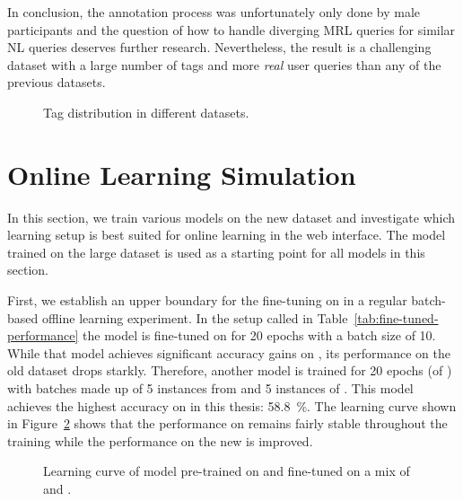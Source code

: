 In conclusion, the annotation process was unfortunately only done by male
participants and the question of how to handle diverging MRL queries for similar
NL queries deserves further research. Nevertheless, the result is a challenging
dataset with a large number of tags and more \emph{real} user queries than any
of the previous \nlmaps{} datasets.

\begin{figure}[h]
  \centering
  \resizebox{\textwidth}{!}{}
  \caption[Tag distribution]{Tag distribution in different \nlmaps{} datasets.}
  \label{fig:tag-distribution}
\end{figure}

\section{Online Learning Simulation}
\label{sec:online-simulation}

In this section, we train various models on the new \nlmapsfour{} dataset and
investigate which learning setup is best suited for online learning in the web
interface. The model trained on the large \nlmapsthree{} dataset is used as a
starting point for all models in this section.

First, we establish an upper boundary for the fine-tuning on \nlmfour{} in a
regular batch-based offline learning experiment. In the setup called \nlmthree{}
\textrightarrow{} \nlmfour{} in Table~\ref{tab:fine-tuned-performance} the model
is fine-tuned on \nlmfour{} for \num{20} epochs with a batch size of \num{10}.
While that model achieves significant accuracy gains on \nlmfour{}, its
performance on the old dataset \nlmthree{} drops starkly. Therefore, another
model is trained for \num{20} epochs (of \nlmfour{}) with batches made up of
\num{5} instances from \nlmfour{} and \num{5} instances of \nlmthree{}. This
model achieves the highest accuracy on \nlmfour{} in this thesis: \SI{58.8}{\%}.
The learning curve shown in Figure~\ref{fig:v3-v4-learning-curve} shows that the
performance on \nlmthree{} remains fairly stable throughout the training while
the performance on the new \nlmfour{} is improved.

\begin{figure}[h]
  \centering
  \resizebox{\textwidth}{!}{}
  \caption[\nlmthree{}+\nlmfour{} learning curve]{Learning curve of model
    pre-trained on \nlmapsthree{} and fine-tuned on a mix of \nlmapsthree{} and
    \nlmapsfour{}.}
  \label{fig:v3-v4-learning-curve}
\end{figure}

